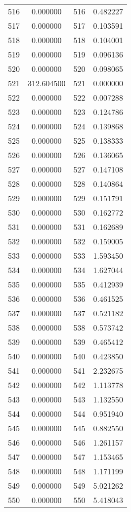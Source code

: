 \documentclass[12pt]{article}
\begin{document}
\begin{longtable}{@{}cccc@{}}
516 & 0.000000 & 516 & 0.482227 \\
517 & 0.000000 & 517 & 0.103591 \\
518 & 0.000000 & 518 & 0.104001 \\
519 & 0.000000 & 519 & 0.096136 \\
520 & 0.000000 & 520 & 0.098065 \\
521 & 312.604500 & 521 & 0.000000 \\
522 & 0.000000 & 522 & 0.007288 \\
523 & 0.000000 & 523 & 0.124786 \\
524 & 0.000000 & 524 & 0.139868 \\
525 & 0.000000 & 525 & 0.138333 \\
526 & 0.000000 & 526 & 0.136065 \\
527 & 0.000000 & 527 & 0.147108 \\
528 & 0.000000 & 528 & 0.140864 \\
529 & 0.000000 & 529 & 0.151791 \\
530 & 0.000000 & 530 & 0.162772 \\
531 & 0.000000 & 531 & 0.162689 \\
532 & 0.000000 & 532 & 0.159005 \\
533 & 0.000000 & 533 & 1.593450 \\
534 & 0.000000 & 534 & 1.627044 \\
535 & 0.000000 & 535 & 0.412939 \\
536 & 0.000000 & 536 & 0.461525 \\
537 & 0.000000 & 537 & 0.521182 \\
538 & 0.000000 & 538 & 0.573742 \\
539 & 0.000000 & 539 & 0.465412 \\
540 & 0.000000 & 540 & 0.423850 \\
541 & 0.000000 & 541 & 2.232675 \\
542 & 0.000000 & 542 & 1.113778 \\
543 & 0.000000 & 543 & 1.132550 \\
544 & 0.000000 & 544 & 0.951940 \\
545 & 0.000000 & 545 & 0.882550 \\
546 & 0.000000 & 546 & 1.261157 \\
547 & 0.000000 & 547 & 1.153465 \\
548 & 0.000000 & 548 & 1.171199 \\
549 & 0.000000 & 549 & 5.021262 \\
550 & 0.000000 & 550 & 5.418043 \\

\end{longtable}
\end{document}
